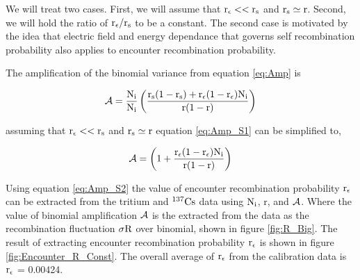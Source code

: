 We will treat two cases. First, we will assume that $\rm r_\epsilon << r_s$ and $\rm r_s \simeq r$. Second, we will hold the ratio of $\rm r_\epsilon/r_s$ to be a constant. The second case is motivated by the idea that electric field and energy dependance that governs self recombination probability also applies to encounter recombination probability.

The amplification of the binomial variance from equation \ref{eq:Amp} is

\begin{equation}
\rm \mathcal{A} =\frac{N_i}{N_i} \left( \frac{ r_s(1-r_s) + r_\epsilon(1-r_\epsilon)N_i }{ r(1-r) } \right)
\label{eq:Amp_S1}
\end{equation}

\noindent assuming that $\rm r_\epsilon << r_s$ and $\rm r_s \simeq r$ equation \ref{eq:Amp_S1} can be simplified to, 

\begin{equation}
\rm \mathcal{A} =\left(1 +  \frac{ r_\epsilon(1-r_\epsilon)N_i }{ r(1-r) } \right)
\label{eq:Amp_S2}
\end{equation}
 
\noindent  Using equation \ref{eq:Amp_S2} the value of encounter recombination probability $\rm r_\epsilon$ can be extracted from the tritium and $\rm^{137}Cs$ data using $\rm N_i$, r, and $\rm \mathcal{A}$.  Where the value of binomial amplification $\rm \mathcal{A}$ is the extracted from the data as the recombination fluctuation $\rm \sigma R$ over binomial, shown in figure \ref{fig:R_Big}. The result of extracting encounter recombination probability $\rm r_\epsilon$ is shown in figure \ref{fig:Encounter_R_Const}. The overall average of  $\rm r_\epsilon$ from the calibration data is $\rm r_\epsilon$ = 0.00424.

\newpage

